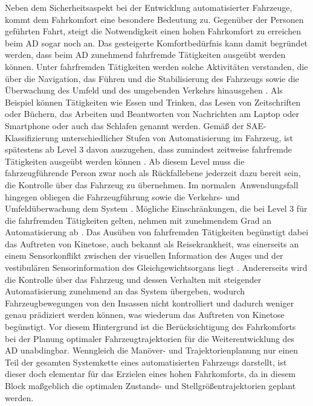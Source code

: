 Neben dem Sicherheitsaspekt bei der Entwicklung automatisierter Fahrzeuge, kommt dem Fahrkomfort eine besondere Bedeutung zu. Gegenüber der Personen geführten Fahrt, steigt die Notwendigkeit einen hohen Fahrkomfort zu erreichen beim \gls{AD} sogar noch an. Das gesteigerte Komfortbedürfnis kann damit begründet werden, dass beim \gls{AD} zunehmend fahrfremde Tätigkeiten ausgeübt werden können. Unter fahrfremden Tätigkeiten werden solche Aktivitäten verstanden, die über die Navigation, das Führen und die Stabilisierung des Fahrzeugs sowie die Überwachung des Umfeld und des umgebenden Verkehrs hinausgehen \cite{Festner.2019}. Als Beispiel können Tätigkeiten wie Essen und Trinken, das Lesen von Zeitschriften oder Büchern, das Arbeiten und Beantworten von Nachrichten am Laptop oder Smartphone oder auch das Schlafen genannt werden. Gemäß der SAE-Klassifizierung \cite{SAETaxonomy.2018} unterschiedlicher Stufen von Automatisierung im Fahrzeug, ist spätestens ab Level 3 davon auszugehen, dass zumindest zeitweise fahrfremde Tätigkeiten ausgeübt werden können \cite{Festner.2019}. Ab diesem Level muss die fahrzeugführende Person zwar noch als Rückfallebene jederzeit dazu bereit sein, die Kontrolle über das Fahrzeug zu übernehmen. Im \glqq normalen\grqq~Anwendungsfall hingegen obliegen die Fahrzeugführung sowie die Verkehrs- und Umfeldüberwachung dem System \cite{SAETaxonomy.2018}. Mögliche Einschränkungen, die bei Level 3 für die fahrfremden Tätigkeiten gelten, nehmen mit zunehmendem Grad an Automatisierung ab \cite{Festner.2019}. Das Ausüben von fahrfremden Tätigkeiten begünstigt dabei das Auftreten von Kinetose, auch bekannt als Reisekrankheit, was einerseits an einem Sensorkonflikt zwischen der visuellen Information des Auges und der vestibulären Sensorinformation des Gleichgewichtsorgans liegt \cite{Reason.1975,Golding.2006,Benson.2002}. Andererseits wird die Kontrolle über das Fahrzeug und dessen Verhalten mit steigender Automatisierung zunehmend an das System übergeben, wodurch Fahrzeugbewegungen von den Insassen nicht kontrolliert und dadurch weniger genau prädiziert werden können, was wiederum das Auftreten von Kinetose \cite{Rolnick.1991} begünstigt. Vor diesem Hintergrund ist die Berücksichtigung des Fahrkomforts bei der Planung optimaler Fahrzeugtrajektorien für die Weiterentwicklung des \gls{AD} unabdingbar. Wenngleich die Manöver- und Trajektorienplanung nur einen Teil der gesamten Systemkette eines automatisierten Fahrzeugs darstellt, ist dieser doch elementar für das Erzielen eines hohen Fahrkomforts, da in diesem Block maßgeblich die optimalen Zustands- und Stellgrößentrajektorien geplant werden. 

